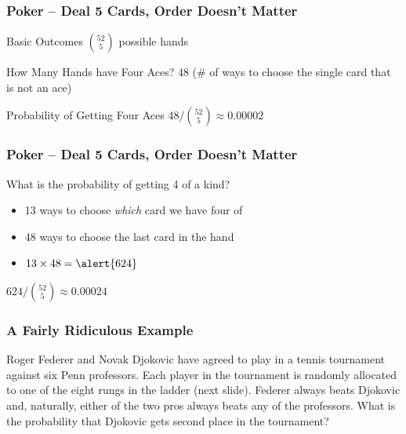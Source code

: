 \documentclass{beamer}
\begin{document}
\begin{frame}

\frametitle{Poker -- Deal 5 Cards, Order Doesn't Matter}

\begin{block}{Basic Outcomes}
\vspace{0.3em} 
$\displaystyle{52 \choose 5}$ possible hands
\end{block}
\begin{block}{How Many Hands have Four Aces? } \pause
\alert{48 (\# of ways to choose the single card that is not an ace)}
\end{block}

\begin{block}{Probability of Getting Four Aces}
\vspace{0.3em} 
$48/\displaystyle{52 \choose 5} \approx 0.00002$
\end{block}


\end{frame}
\begin{frame}
\frametitle{Poker -- Deal 5 Cards, Order Doesn't Matter}
\begin{block}{What is the probability of getting 4 of a kind?}
	\begin{itemize}
		\item 13 ways to choose \emph{which} card we have four of
		\item 48 ways to choose the last card in the hand 
		\item $13 \times 48 = \alert{624}$ 
	\end{itemize}
\end{block}
\vspace{0.3em} 
$624/\displaystyle{52 \choose 5} \approx 0.00024$

\end{frame}
\begin{frame}
\frametitle{A Fairly Ridiculous Example}

Roger Federer and Novak Djokovic have agreed to play in a tennis tournament against six Penn professors. Each player in the tournament is randomly allocated to one of the eight rungs in the ladder (next slide). Federer always beats Djokovic and, naturally, either of the two pros always beats any of the professors. What is the probability that Djokovic gets second place in the tournament? 



\end{frame}
\end{document}
